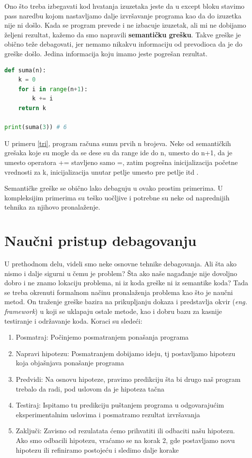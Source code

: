 \documentclass[a4paper]{article}
\begin{document}
Ono što treba izbegavati kod hvatanja izuzetaka jeste da u except bloku stavimo pass naredbu kojom nastavljamo dalje izvršavanje programa kao da do izuzetka nije ni došlo\cite{proPyDeb}.
Kada se program prevede i ne izbacuje izuzetak, ali mi ne dobijamo željeni rezultat, kažemo da smo napravili \textbf{semantičku grešku}. Takve greške je obično teže debagovati, jer nemamo nikakvu informaciju od prevodioca da je do greške došlo. Jedina informacija koju imamo jeste pogrešan rezultat.
\begin{lstlisting}[language = python, caption = {Funkcija koja računa sumu prvih n brojeva}, label=tri]
def suma(n):
    k = 0
    for i in range(n+1):
        k += i
    return k

print(suma(3)) # 6
\end{lstlisting}
U primeru \ref{tri}, program računa sumu prvih n brojeva. Neke od semantičkih grešaka koje su mogle da se dese su da range ide do n, umesto do n+1, da je umesto operatora += stavljeno samo =, zatim pogrešna inicijalizacija početne vrednosti za k, inicijalizacija unutar petlje umesto pre petlje itd \cite{proPyDeb}.

Semantičke greške se obično lako debaguju u ovako prostim primerima. U kompleksijim primerima su teško uočljive i potrebne su neke od naprednijih tehnika za njihovo pronalaženje.

\section{Naučni pristup debagovanju}
U prethodnom delu, videli smo neke osnovne tehnike debagovanja. Ali šta ako nismo i dalje sigurni u čemu je problem? Šta ako naše nagađanje nije dovoljno dobro i ne znamo lokaciju problema, ni iz koda greške ni iz semantike koda? Tada se treba okrenuti formalnom načinu pronalaženja problema kao što je naučni metod. On traženje greške bazira na prikupljanju dokaza i predstavlja okvir (\emph{eng. framework}) u koji se uklapaju ostale metode, kao i dobru bazu za kasnije testiranje i održavanje koda.
	 Koraci su sledeći\cite{proPyDeb}:
	 \begin{enumerate}
	     \item Posmatraj: Počinjemo posmatranjem ponašanja programa 
	     \item Napravi hipotezu: Posmatranjem dobijamo ideju, tj postavljamo hipotezu koja objašnjava ponašanje programa
	     \item Predvidi: Na osnovu hipoteze, pravimo predikciju šta bi drugo naš program trebalo da radi, pod uslovom da je hipoteza tačna
	     \item Testiraj: Ispitamo tu predikciju puštanjem programa u odgovarajućim eksperimentalnim uslovima i posmatramo rezultat izvršavanja
	     \item Zaključi: Zavisno od rezulatata ćemo prihvatiti ili odbaciti našu hipotezu. Ako smo odbacili hipotezu, vraćamo se na korak 2, gde postavljamo novu hipotezu ili refiniramo postojeću i sledimo dalje korake
	 \end{enumerate}
\end{document}
